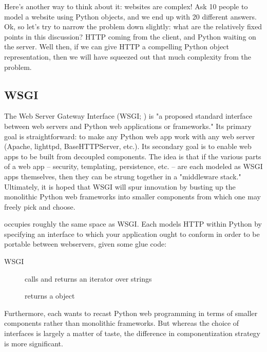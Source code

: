 Here's another way to think about it: websites are complex! Ask 10 people to
model a website using Python objects, and we end up with 20 different answers.
Ok, so let's try to narrow the problem down slightly: what are the relatively
fixed points in this discussion? HTTP coming from the client, and Python waiting
on the server. Well then, if we can give HTTP a compelling Python object
representation, then we will have squeezed out that much complexity from the
problem.


\subsection{WSGI \label{wsgi}}

The Web Server Gateway Interface (WSGI; ) is "a proposed standard
interface between web servers and Python web applications or frameworks." Its
primary goal is straightforward: to make any Python web app work with any web
server (Apache, lighttpd, BaseHTTPServer, etc.). Its secondary goal is to enable
web apps to be built from decoupled components. The idea is that if the various
parts of a web app -- security, templating, persistence, etc. -- are each
modeled as WSGI apps themselves, then they can be strung together in a
"middleware stack." Ultimately, it is hoped that WSGI will spur innovation by
busting up the monolithic Python web frameworks into smaller components from
which one may freely pick and choose.

 occupies roughly the same space as WSGI. Each models HTTP within
Python by specifying an interface to which your application ought to conform in
order to be portable between webservers, given some glue code:

\begin{description}

\item[WSGI]
    { calls  and returns
    an iterator over strings}

\item[]
    { returns a  object}

\end{description}


Furthermore, each wants to recast Python web programming in terms of smaller
components rather than monolithic frameworks. But whereas the choice of
interfaces is largely a matter of taste, the difference in componentization
strategy is more significant.

